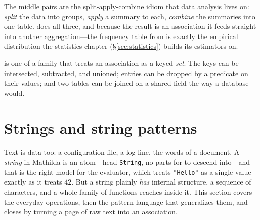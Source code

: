 The middle pairs are the split-apply-combine idiom that
data analysis lives on: \emph{split} the data into groups, \emph{apply} a summary to
each, \emph{combine} the summaries into one table.  does all three, and
because the result is an association it feeds straight into another aggregation---the
frequency table from  is exactly the empirical distribution the statistics
chapter (\S\ref{sec:statistics}) builds its estimators on.

 is one of a family that treats an association as a keyed
\emph{set}. The keys
can be intersected, subtracted, and unioned; entries can be dropped by a predicate on
their values; and two tables can be joined on a shared field the way a database would.

\begin{codepairs}
\end{codepairs}


\section{Strings and string patterns}
\label{sec:ds-strings}

Text is data too: a configuration file, a log line, the words of a document. A
\emph{string} in Mathilda is an atom---head \texttt{String}, no parts
for  to descend into---and that is the right model for the evaluator,
which treats \texttt{"Hello"} as a single value exactly as it treats \(42\). But a
string plainly \emph{has} internal structure, a sequence of characters, and a whole
family of functions reaches inside it. This section covers the everyday operations,
then the pattern language that generalizes them, and closes by turning a page of raw
text into an association.

